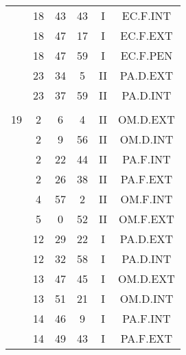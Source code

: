 \documentclass[12pt, a4paper]{article}
\begin{document}
\begin{multicols}{3}
{\begin{tabular}{c c c c c c}
	 	 	 	 & 18 & 43 & 43 & I & EC.F.INT\\%
	 	 	 	 & 18 & 47 & 17 & I & EC.F.EXT\\%
	 	 	 	 & 18 & 47 & 59 & I & EC.F.PEN\\%
	 	 	 	 & 23 & 34 & 5 & II & PA.D.EXT\\%
	 	 	 	 & 23 & 37 & 59 & II & PA.D.INT\\%
	 	 	 	 & & & & & \\%
	 	 	 	19 & 2 & 6 & 4 & II & OM.D.EXT\\%
	 	 	 	 & 2 & 9 & 56 & II & OM.D.INT\\%
	 	 	 	 & 2 & 22 & 44 & II & PA.F.INT\\%
	 	 	 	 & 2 & 26 & 38 & II & PA.F.EXT\\%
	 	 	 	 & 4 & 57 & 2 & II & OM.F.INT\\%
	 	 	 	 & 5 & 0 & 52 & II & OM.F.EXT\\%
	 	 	 	 & 12 & 29 & 22 & I & PA.D.EXT\\%
	 	 	 	 & 12 & 32 & 58 & I & PA.D.INT\\%
	 	 	 	 & 13 & 47 & 45 & I & OM.D.EXT\\%
	 	 	 	 & 13 & 51 & 21 & I & OM.D.INT\\%
	 	 	 	 & 14 & 46 & 9 & I & PA.F.INT\\%
	 	 	 	 & 14 & 49 & 43 & I & PA.F.EXT\\%
	 	 \end{tabular}
 	}
\end{multicols}
\end{document}

